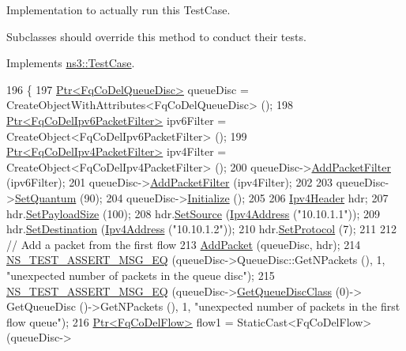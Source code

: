 Implementation to actually run this Test\+Case. 

Subclasses should override this method to conduct their tests. 

Implements \hyperlink{classns3_1_1TestCase_a8ff74680cf017ed42011e4be51917a24}{ns3\+::\+Test\+Case}.


\begin{DoxyCode}
196 \{
197   \hyperlink{classns3_1_1Ptr}{Ptr<FqCoDelQueueDisc>} queueDisc = CreateObjectWithAttributes<FqCoDelQueueDisc> ();
198   \hyperlink{classns3_1_1Ptr}{Ptr<FqCoDelIpv6PacketFilter>} ipv6Filter = 
      CreateObject<FqCoDelIpv6PacketFilter> ();
199   \hyperlink{classns3_1_1Ptr}{Ptr<FqCoDelIpv4PacketFilter>} ipv4Filter = 
      CreateObject<FqCoDelIpv4PacketFilter> ();
200   queueDisc->\hyperlink{classns3_1_1QueueDisc_a45efdc512f64cb8e0d57ad4f208ed4b7}{AddPacketFilter} (ipv6Filter);
201   queueDisc->\hyperlink{classns3_1_1QueueDisc_a45efdc512f64cb8e0d57ad4f208ed4b7}{AddPacketFilter} (ipv4Filter);
202 
203   queueDisc->\hyperlink{classns3_1_1FqCoDelQueueDisc_a3d7f222490f1df11be26ee4b3f0dfce5}{SetQuantum} (90);
204   queueDisc->\hyperlink{classns3_1_1Object_af4411cb29971772fcd09203474a95078}{Initialize} ();
205 
206   \hyperlink{classns3_1_1Ipv4Header}{Ipv4Header} hdr;
207   hdr.\hyperlink{classns3_1_1Ipv4Header_a3e961181f7839619a68bb7a2dcd483b0}{SetPayloadSize} (100);
208   hdr.\hyperlink{classns3_1_1Ipv4Header_af3c8c140e302ec4aa1dc885ce1dcc070}{SetSource} (\hyperlink{classns3_1_1Ipv4Address}{Ipv4Address} (\textcolor{stringliteral}{"10.10.1.1"}));
209   hdr.\hyperlink{classns3_1_1Ipv4Header_a154e584fb5418de7a5ce34dbb852de02}{SetDestination} (\hyperlink{classns3_1_1Ipv4Address}{Ipv4Address} (\textcolor{stringliteral}{"10.10.1.2"}));
210   hdr.\hyperlink{classns3_1_1Ipv4Header_aca424df8132b7717fb4c315fcb4ce4bf}{SetProtocol} (7);
211 
212   \textcolor{comment}{// Add a packet from the first flow}
213   \hyperlink{classFqCoDelQueueDiscDeficit_a366b7108078d16452276b4be0b679ac9}{AddPacket} (queueDisc, hdr);
214   \hyperlink{group__testing_ga2a9d78cffb3db8e867c35fff0b698cf5}{NS\_TEST\_ASSERT\_MSG\_EQ} (queueDisc->QueueDisc::GetNPackets (), 1, \textcolor{stringliteral}{"unexpected number
       of packets in the queue disc"});
215   \hyperlink{group__testing_ga2a9d78cffb3db8e867c35fff0b698cf5}{NS\_TEST\_ASSERT\_MSG\_EQ} (queueDisc->\hyperlink{classns3_1_1QueueDisc_a584d228f7bff3f754d32793a38134556}{GetQueueDiscClass} (0)->
      GetQueueDisc ()->GetNPackets (), 1, \textcolor{stringliteral}{"unexpected number of packets in the first flow queue"});
216   \hyperlink{classns3_1_1Ptr}{Ptr<FqCoDelFlow>} flow1 = StaticCast<FqCoDelFlow> (queueDisc->

\end{DoxyCode}
